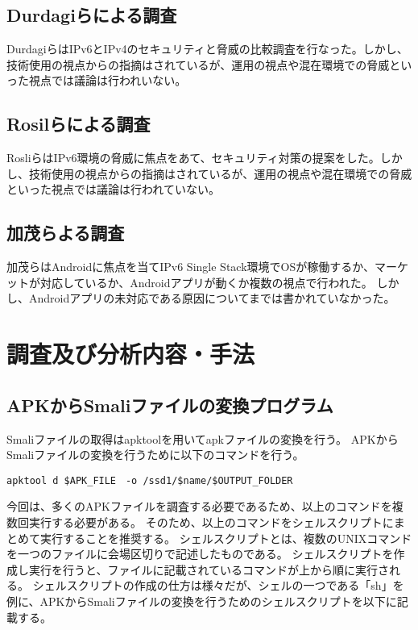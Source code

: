 \documentclass[a4j]{jarticle}
\begin{document}
\subsection{Durdagiらによる調査}
DurdagiらはIPv6とIPv4のセキュリティと脅威の比較調査を行なった。しかし、技術使用の視点からの指摘はされているが、運用の視点や混在環境での脅威といった視点では議論は行われいない。

\subsection{Rosilらによる調査}
RosliらはIPv6環境の脅威に焦点をあて、セキュリティ対策の提案をした。しかし、技術使用の視点からの指摘はされているが、運用の視点や混在環境での脅威といった視点では議論は行われていない。


\subsection{加茂らよる調査}
加茂らはAndroidに焦点を当てIPv6 Single Stack環境でOSが稼働するか、マーケットが対応しているか、Androidアプリが動くか複数の視点で行われた。
しかし、Androidアプリの未対応である原因についてまでは書かれていなかった。

\newpage
\section{調査及び分析内容・手法}
\subsection{APKからSmaliファイルの変換プログラム}
Smaliファイルの取得はapktoolを用いてapkファイルの変換を行う。
APKからSmaliファイルの変換を行うために以下のコマンドを行う。

\begin{lstlisting}[caption=APKからSmaliファイルの変換のコマンド]
	apktool d $APK_FILE　-o /ssd1/$name/$OUTPUT_FOLDER
\end{lstlisting}

今回は、多くのAPKファイルを調査する必要であるため、以上のコマンドを複数回実行する必要がある。
そのため、以上のコマンドをシェルスクリプトにまとめて実行することを推奨する。
シェルスクリプトとは、複数のUNIXコマンドを一つのファイルに会場区切りで記述したものである。
シェルスクリプトを作成し実行を行うと、ファイルに記載されているコマンドが上から順に実行される。
シェルスクリプトの作成の仕方は様々だが、シェルの一つである「sh」を例に、APKからSmaliファイルの変換を行うためのシェルスクリプトを以下に記載する。
\end{document}
